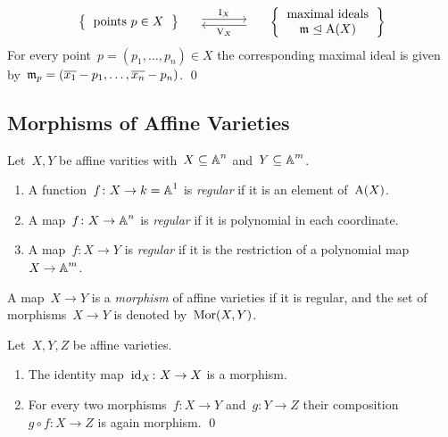 \begin{theorem}
\[\begin{matrix}
      \\
        {}
      & {}
      & {}
      \\
        \left\{
          \begin{tabular}{c}
            points~$p \in X$
          \end{tabular}
        \right\}
      & \begin{tikzcd}[column sep = large]
            {}
            \arrow[shift left]{r}{\videal_X}
          & {}
            \arrow[shift left]{l}{\vset_X}
        \end{tikzcd}
      & \left\{
          \begin{tabular}{c}
            maximal ideals \\
            $\mf{m} \idealleq \coord(X)$
          \end{tabular}
        \right\}
    \end{matrix}
  \]
  For every point~$p = (p_1, \dotsc, p_n) \in X$ the corresponding maximal ideal is given by~$\mathfrak{m}_p = (\overline{x_1} - p_1, \dotsc, \overline{x_n} - p_n)$.
  \qed
\end{theorem}





\subsection{Morphisms of Affine Varieties}


\begin{definition}
  Let~$X,Y$ be affine varities with~$X \subseteq \operatorname{\mathbb{A}}^n$ and~$Y \subseteq \operatorname{\mathbb{A}}^m$.
  \begin{enumerate}
    \item
      A function~$f \colon X \to k = \operatorname{\mathbb{A}}^1$ is \emph{regular} if it is an element of~$\operatorname{A}(X)$.
    \item
      A map~$f \colon X \to \operatorname{\mathbb{A}}^n$ is \emph{regular} if it is polynomial in each coordinate.
    \item
      A map~$f \colon X \to Y$ is \emph{regular} if it is the restriction of a polynomial map~$X \to \operatorname{\mathbb{A}}^m$.
  \end{enumerate}
  A map~$X \to Y$ is a \emph{morphism} of affine varieties if it is regular, and the set of morphisms~$X \to Y$ is denoted by~$\operatorname{Mor}(X,Y)$.
\end{definition}


\begin{lemma}
  Let~$X, Y, Z$ be affine varieties.
  \begin{enumerate}
    \item
      The identity map~$\operatorname{id}_X \colon X \to X$ is a morphism.
    \item
      For every two morphisms~$f \colon X \to Y$ and~$g \colon Y \to Z$ their composition~$g \circ f \colon X \to Z$ is again morphism.
    \qed
  \end{enumerate}
\end{lemma}


